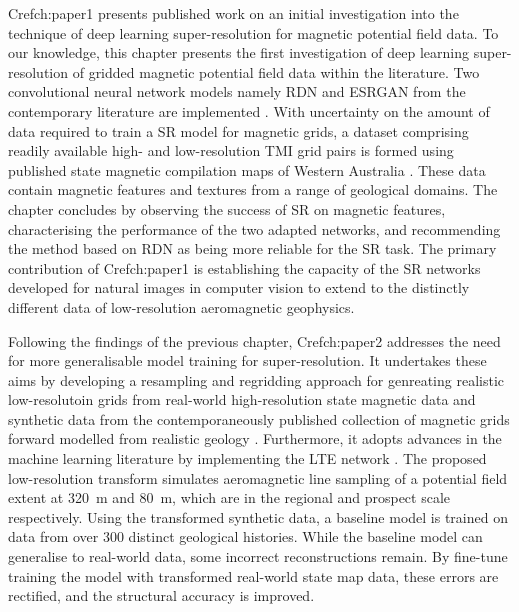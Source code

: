\documentclass[manuscript.tex]{subfiles}
\begin{document}
Cref{ch:paper1} presents published work on an initial investigation into the technique of deep learning super-resolution for magnetic potential field data.
To our knowledge, this chapter presents the first investigation of deep learning super-resolution of gridded magnetic potential field data within the literature.
Two convolutional neural network models namely RDN and ESRGAN from the contemporary literature are implemented \parencite{zhangResidualDenseNetwork2018,limEnhancedDeepResidual2017}.
With uncertainty on the amount of data required to train a SR model for magnetic grids, a dataset comprising readily available high- and low-resolution TMI grid pairs is formed using published state magnetic compilation maps of Western Australia \parencite{brett20MagneticMerged2020}.
These data contain magnetic features and textures from a range of geological domains.
The chapter concludes by observing the success of SR on magnetic features, characterising the performance of the two adapted networks, and recommending the method based on RDN as being more reliable for the SR task.
The primary contribution of Cref{ch:paper1} is establishing the capacity of the SR networks developed for natural images in computer vision to extend to the distinctly different data of low-resolution aeromagnetic geophysics.

Following the findings of the previous chapter, Cref{ch:paper2} addresses the need for more generalisable model training for super-resolution.
It undertakes these aims by developing a resampling and regridding approach for genreating realistic low-resolutoin grids from real-world high-resolution state magnetic data and synthetic data from the contemporaneously published collection of magnetic grids forward modelled from realistic geology \parencite{jessellNoddyverseMassiveData2022}.
Furthermore, it adopts advances in the machine learning literature by implementing the LTE network \parencite{leeLocalTextureEstimator2022}.
The proposed low-resolution transform simulates aeromagnetic line sampling of a potential field extent at \qty{320}{\m} and \qty{80}{\m}, which are in the regional and prospect scale respectively.
Using the transformed synthetic data, a baseline model is trained on data from over \num{300} distinct geological histories.
While the baseline model can generalise to real-world data, some incorrect reconstructions remain.
By fine-tune training the model with transformed real-world state map data, these errors are rectified, and the structural accuracy is improved.
\end{document}
